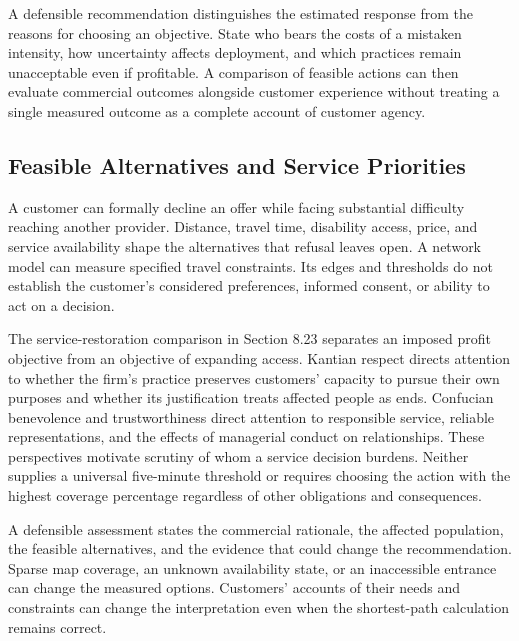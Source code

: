 A defensible recommendation distinguishes the estimated response from
the reasons for choosing an objective. State who bears the costs of a
mistaken intensity, how uncertainty affects deployment, and which
practices remain unacceptable even if profitable. A comparison of
feasible actions can then evaluate commercial outcomes alongside
customer experience without treating a single measured outcome as a
complete account of customer agency.


\hypertarget{M09-feasible-alternatives-and-service-priorities}{%
\subsection{Feasible Alternatives and Service
Priorities}\label{M09-feasible-alternatives-and-service-priorities}}

\noindent \noindent A customer can formally decline an offer while facing
substantial difficulty reaching another provider. Distance, travel time,
disability access, price, and service availability shape the
alternatives that refusal leaves open. A network model can measure
specified travel constraints. Its edges and thresholds do not establish
the customer's considered preferences, informed consent, or ability to
act on a decision.

The service-restoration comparison in Section 8.23 separates an imposed
profit objective from an objective of expanding access. Kantian respect
directs attention to whether the firm's practice preserves customers'
capacity to pursue their own purposes and whether its justification
treats affected people as ends. Confucian benevolence and
trustworthiness direct attention to responsible service, reliable
representations, and the effects of managerial conduct on relationships.
These perspectives motivate scrutiny of whom a service decision burdens.
Neither supplies a universal five-minute threshold or requires choosing
the action with the highest coverage percentage regardless of other
obligations and consequences.

A defensible assessment states the commercial rationale, the affected
population, the feasible alternatives, and the evidence that could
change the recommendation. Sparse map coverage, an unknown availability
state, or an inaccessible entrance can change the measured options.
Customers' accounts of their needs and constraints can change the
interpretation even when the shortest-path calculation remains correct.

